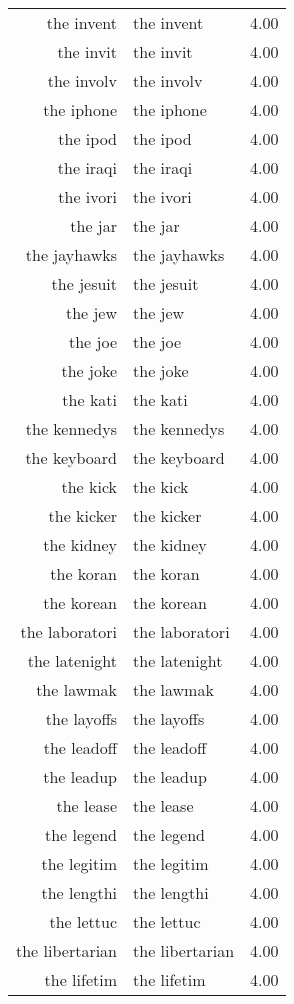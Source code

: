 \begin{table}[ht]
\begin{tabular}{rlr}
  the invent & the invent & 4.00 \\ 
  the invit & the invit & 4.00 \\ 
  the involv & the involv & 4.00 \\ 
  the iphone & the iphone & 4.00 \\ 
  the ipod & the ipod & 4.00 \\ 
  the iraqi & the iraqi & 4.00 \\ 
  the ivori & the ivori & 4.00 \\ 
  the jar & the jar & 4.00 \\ 
  the jayhawks & the jayhawks & 4.00 \\ 
  the jesuit & the jesuit & 4.00 \\ 
  the jew & the jew & 4.00 \\ 
  the joe & the joe & 4.00 \\ 
  the joke & the joke & 4.00 \\ 
  the kati & the kati & 4.00 \\ 
  the kennedys & the kennedys & 4.00 \\ 
  the keyboard & the keyboard & 4.00 \\ 
  the kick & the kick & 4.00 \\ 
  the kicker & the kicker & 4.00 \\ 
  the kidney & the kidney & 4.00 \\ 
  the koran & the koran & 4.00 \\ 
  the korean & the korean & 4.00 \\ 
  the laboratori & the laboratori & 4.00 \\ 
  the latenight & the latenight & 4.00 \\ 
  the lawmak & the lawmak & 4.00 \\ 
  the layoffs & the layoffs & 4.00 \\ 
  the leadoff & the leadoff & 4.00 \\ 
  the leadup & the leadup & 4.00 \\ 
  the lease & the lease & 4.00 \\ 
  the legend & the legend & 4.00 \\ 
  the legitim & the legitim & 4.00 \\ 
  the lengthi & the lengthi & 4.00 \\ 
  the lettuc & the lettuc & 4.00 \\ 
  the libertarian & the libertarian & 4.00 \\ 
  the lifetim & the lifetim & 4.00 \\ 

\end{tabular}
\end{table}
